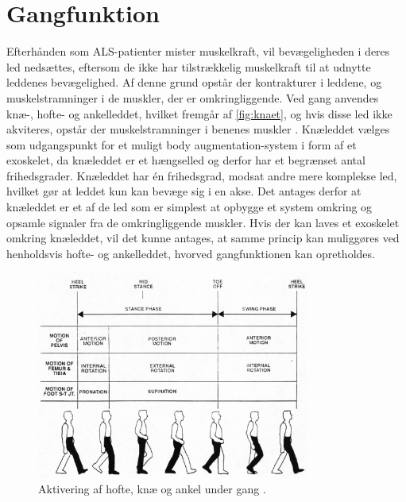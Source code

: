 \section{Gangfunktion}
Efterhånden som ALS-patienter mister muskelkraft, vil bevægeligheden i deres led nedsættes, eftersom de ikke har tilstrækkelig muskelkraft til at udnytte leddenes bevægelighed. Af denne grund opstår der kontrakturer i leddene, og muskelstramninger i de muskler, der er omkringliggende. Ved gang anvendes knæ-, hofte- og ankelleddet, hvilket fremgår af \autoref{fig:knaet}, og hvis disse led ikke akviteres, opstår der muskelstramninger i benenes muskler \citep{instforms2008}. Knæleddet vælges som udgangspunkt for et muligt body augmentation-system i form af et exoskelet, da knæleddet er et hængselled og derfor har et begrænset antal frihedsgrader. Knæleddet har én frihedsgrad, modsat andre mere komplekse led, hvilket gør at leddet kun kan bevæge sig i en akse. Det antages derfor at knæleddet er et af de led som er simplest at opbygge et system omkring og opsamle signaler fra de omkringliggende muskler. Hvis der kan laves et exoskelet omkring knæleddet, vil det kunne antages, at samme princip kan muliggøres ved henholdsvis hofte- og ankelleddet, hvorved gangfunktionen kan opretholdes.

\begin{figure} [H]
\centering
\includegraphics[width=0.8\textwidth]{figures/knaet}
\caption{Aktivering af hofte, knæ og ankel under gang \citep{orthopedics2016}.}
\label{fig:knaet}
\end{figure} 

